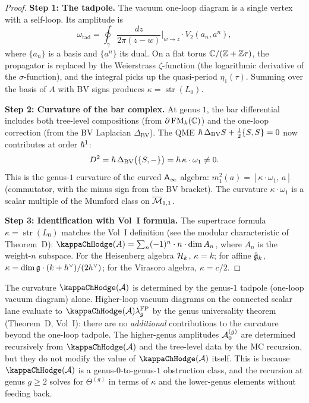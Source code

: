 \begin{proof}
\textbf{Step 1: The tadpole.}
The vacuum one-loop diagram is a single vertex with a self-loop.
Its amplitude is
\[
\omega_{\mathrm{tad}}
= \oint_{\gamma} \frac{dz}{2\pi(z - w)}\bigg|_{w \to z}
\cdot V_2(a_n, a^n),
\]
where $\{a_n\}$ is a basis and $\{a^n\}$ its dual. On a flat
torus $\mathbb{C} / (\mathbb{Z} + \mathbb{Z}\tau)$, the propagator is replaced by the
Weierstrass $\zeta$-function (the logarithmic derivative of the
$\sigma$-function), and the integral picks up the quasi-period
$\eta_1(\tau)$. Summing over the basis of $A$ with BV signs
produces $\kappa = \operatorname{str}(L_0)$.

\medskip\noindent\textbf{Step 2: Curvature of the bar complex.}
At genus $1$, the bar differential includes both tree-level
compositions (from $\partial\operatorname{FM}_k(\mathbb{C})$) and the one-loop
correction (from the BV Laplacian $\Delta_{\mathrm{BV}}$).
The QME $\hbar\,\Delta_{\mathrm{BV}}S + \tfrac{1}{2}\{S,S\} = 0$
now contributes at order $\hbar^1$:
\[
D^2 = \hbar\,\Delta_{\mathrm{BV}}\bigl(\{S, -\}\bigr)
= \hbar\,\kappa \cdot \omega_1 \ne 0.
\]
This is the genus-$1$ curvature of the curved $\mathsf{A}_{\infty}$ algebra:
$m_1^2(a) = [\kappa \cdot \omega_1,\, a]$ (commutator, with the
minus sign from the BV bracket). The curvature $\kappa \cdot
\omega_1$ is a scalar multiple of the Mumford class on
$\overline{\mathcal{M}}_{1,1}$.

\medskip\noindent\textbf{Step 3: Identification with
Vol~I formula.}
The supertrace formula $\kappa = \operatorname{str}(L_0)$ matches
the Vol~I definition (see the modular characteristic of
Theorem~D): $\kappaChHodge(A) = \sum_n (-1)^n \cdot n \cdot
\dim A_n$, where $A_n$ is the weight-$n$ subspace. For the
Heisenberg algebra $\mathcal{H}_k$, $\kappa = k$; for affine
$\hat{\mathfrak{g}}_k$, $\kappa = \dim\mathfrak{g} \cdot (k + h^\vee) / (2h^\vee)$; for the
Virasoro algebra, $\kappa = c/2$.
\end{proof}

\begin{remark}
The curvature $\kappaChHodge(\cA)$ is determined by the genus-$1$ tadpole
(one-loop vacuum diagram) alone. Higher-loop vacuum diagrams
on the connected scalar lane evaluate to
$\kappaChHodge(\cA)\lambda_g^{\mathrm{FP}}$
by the genus universality theorem (Theorem~D, Vol~I): there are
no \emph{additional} contributions to the curvature beyond the
one-loop tadpole. The higher-genus amplitudes $\mathcal{A}^{(g)}_0$
are determined recursively from $\kappaChHodge(\cA)$ and the tree-level data
by the MC recursion, but they do not modify the value of
\(\kappaChHodge(\cA)\)
itself. This is because $\kappaChHodge(\cA)$ is a genus-$0$-to-genus-$1$
obstruction class, and the recursion at genus $g \geq 2$ solves
for $\Theta^{(g)}$ in terms of $\kappa$ and the lower-genus
elements without feeding back.
\end{remark}


